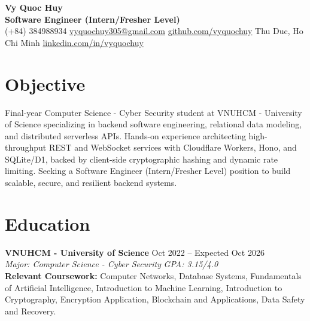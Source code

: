 \documentclass[10pt,a4paper]{article}
\begin{document}
\pagestyle{empty}

\begin{center}
    {\huge \textbf{Vy Quoc Huy}} \\ \vspace{4pt}
    {\Large \textbf{Software Engineer (Intern/Fresher Level)}} \\ \vspace{4pt}
    (+84) 384988934 \quad \href{mailto:vyquochuy305@gmail.com}{vyquochuy305@gmail.com} \quad \href{https://github.com/vyquochuy}{github.com/vyquochuy} \quad Thu Duc, Ho Chi Minh \quad \href{https://www.linkedin.com/in/vyquochuy/}{linkedin.com/in/vyquochuy}
\end{center}

\section*{Objective}
Final-year Computer Science - Cyber Security student at VNUHCM - University of Science specializing in backend software engineering, relational data modeling, and distributed serverless APIs. Hands-on experience architecting high-throughput REST and WebSocket services with Cloudflare Workers, Hono, and SQLite/D1, backed by client-side cryptographic hashing and dynamic rate limiting. Seeking a Software Engineer (Intern/Fresher Level) position to build scalable, secure, and resilient backend systems.

\section*{Education}
\noindent \textbf{VNUHCM - University of Science} \hfill Oct 2022 -- Expected Oct 2026\\
\textit{Major: Computer Science - Cyber Security} \hfill \textit{GPA: 3.15/4.0}\\
\textbf{Relevant Coursework:} Computer Networks, Database Systems, Fundamentals of Artificial Intelligence, Introduction to Machine Learning, Introduction to Cryptography, Encryption Application, Blockchain and Applications, Data Safety and Recovery.

\end{document}
